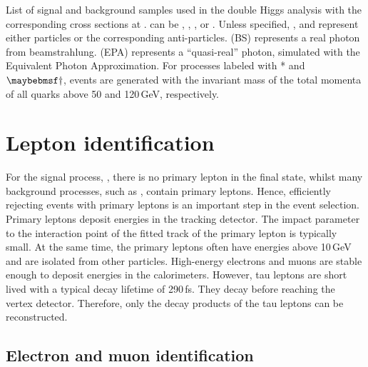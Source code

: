 \begin{table}[!htbp]
\caption[Signal and background samples with the corresponding cross sections at .]
{List of signal and background samples used in the double Higgs analysis with the corresponding cross sections at . \Pquark can be \Pup, \Pdown, \Pstrange, \Pbottom or \Ptop. Unless specified, \Pquark, \Plepton and \Pnu represent either particles or the corresponding anti-particles. \Pphoton(BS) represents a real photon from beamstrahlung. \Pphoton(EPA) represents a ``quasi-real'' photon, simulated with the Equivalent Photon Approximation. For processes labeled with * and $\myDagger$, events are generated with the invariant mass of the total momenta of all quarks above 50 and 120\,GeV, respectively.}
\label{tab:doubleHiggsMCSamples}
\end{table}

\section{Lepton identification}
\label{sec:doubleHiggsLepton}

For the signal process, \eeToHHbbWWHad, there is no primary lepton in the final state, whilst many background  processes, such as \HepProcess{\Pquark \Pquark \Pquark \Pquark \Plepton \Pnu}, contain primary leptons. Hence, efficiently rejecting events with primary leptons is an important step in the event selection. Primary leptons deposit energies in the tracking detector. The impact parameter to the interaction point of the fitted track of the primary lepton is typically small. At the same time, the primary leptons often have energies above 10\,GeV and are  isolated from other particles. High-energy electrons and muons are stable enough to deposit energies in the calorimeters. However,  tau leptons are short lived with a typical decay lifetime of 290\,fs\cite{Abreu:1991jn}. They decay before reaching the vertex detector. Therefore, only the decay products of the tau leptons can be reconstructed.





\subsection{Electron and muon identification}
\label{sec:doubleHiggsLeptonID}

